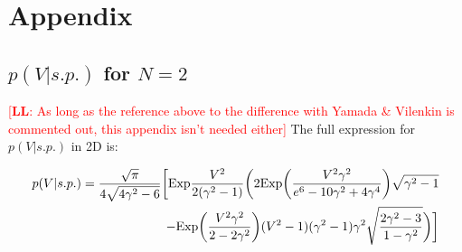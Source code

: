 \documentclass[12pt]{article}
\newcommand{\lfl}[1]{\textcolor{red}{[{\bf LL}: #1]}}
\begin{document}
\section{Appendix}
%
%

\subsection{$p(V|s.p.)$ for $N=2$}
\lfl{As long as the reference above to the difference with Yamada \& Vilenkin is commented out, this appendix isn't needed either}
The full expression for $p(V|s.p.)$ in 2D is:

\begin{equation}
\begin{split}
p(V|s.p.)=\frac{\sqrt{\pi}}{4\sqrt{4\gamma^2-6}}\bigg{[}\mathrm{Exp}\frac{V^2}{2(\gamma^2-1)}\bigg{(}2\mathrm{Exp}\bigg{(}\frac{V^2\gamma^2}{e^6-10\gamma^2+4\gamma^4}\bigg{)}\sqrt{\gamma^2-1}\\
-\mathrm{Exp}\bigg{(}\frac{V^2\gamma^2}{2-2\gamma^2}\bigg{)}(V^2-1)(\gamma^2-1)\gamma^2\sqrt{\frac{2\gamma^2-3}{1-\gamma^2}}\bigg{)}\bigg{]}
\end{split}
\end{equation}
\end{document}
